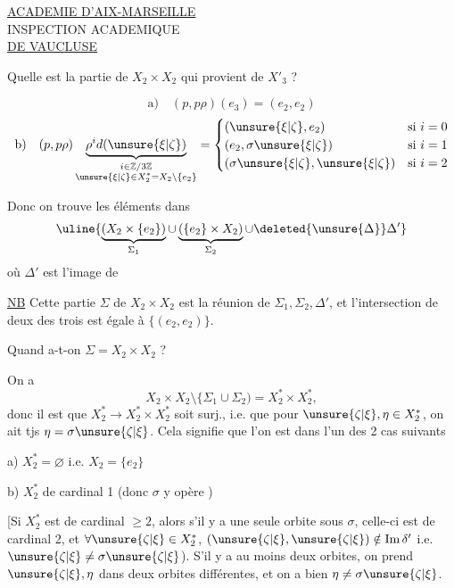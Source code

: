 
\begin{center}
\uline{ACADEMIE D'AIX-MARSEILLE}\\
INSPECTION ACADEMIQUE\\
\uline{DE VAUCLUSE}
\end{center}

Quelle est la partie de $X_2\times X_2$ qui provient de $X'_3$ ?

\[
\text{a)}\quad(p,p\rho)(e_3)=(e_2,e_2)
\]
\[
\text{b)}\quad(p,p\rho)\underbrace{\rho^i d(\unsure{\xi|\zeta})}_{\substack{i\in\mathbb Z/3\mathbb Z\\\unsure{\xi|\zeta}\in X_2^*=X_2\setminus\{e_2\}}}
=\begin{cases}
(\unsure{\xi|\zeta},e_2)&\text{si }i=0\\
(e_2,\sigma\unsure{\xi|\zeta})&\text{si }i=1\\
(\sigma\unsure{\xi|\zeta},\unsure{\xi|\zeta})&\text{si }i=2
\end{cases}
\]

Donc on trouve les éléments  dans
\[
\uline{\underbrace{(X_2\times\{e_2\})}_{\Sigma_1}\cup\underbrace{(\{e_2\}\times X_2)}_{\Sigma_2}\cup\deleted{\unsure{\Delta}}\Delta'}
\]
où $\Delta'$ est l'image de

\uline{NB} Cette partie $\Sigma$ de $X_2\times X_2$ est la réunion de $\Sigma_1,\Sigma_2,\Delta'$, et l'intersection de deux  des trois est égale à $\{(e_2,e_2)\}$.

Quand a-t-on $\Sigma=X_2\times X_2$ ?

 On a
\[
X_2\times X_2\setminus\{\Sigma_1\cup\Sigma_2)=X_2^*\times X_2^*,
\]
donc il est  que $X_2^*\longrightarrow X_2^*\times X_2^*$ soit surj., i.e. que pour $\unsure{\zeta|\xi},\eta\in X_2^*$, on ait tjs $\eta=\sigma\unsure{\zeta|\xi}$. Cela signifie que l'on est dans l'un des 2 cas suivants

a) $X_2^*=\varnothing$ i.e. $X_2=\{e_2\}$

b) $X_2^*$ de cardinal 1 (donc $\sigma$  y opère )


[Si $X_2^*$ est de cardinal $\geq2$, alors s'il y a une seule orbite sous $\sigma$, celle-ci est de cardinal 2, et \deleted{$\unsure{\xi}$} $\forall\unsure{\zeta|\xi}\in X_2^*$, $(\unsure{\zeta|\xi},\unsure{\zeta|\xi})\notin\operatorname{Im}\delta'$ i.e. $\unsure{\zeta|\xi}\ne\sigma\unsure{\zeta|\xi}$). S'il y a  au moins deux orbites, on prend $\unsure{\zeta|\xi},\eta$ dans deux orbites différentes, et on a bien $\eta\ne\sigma\unsure{\zeta|\xi}$.

